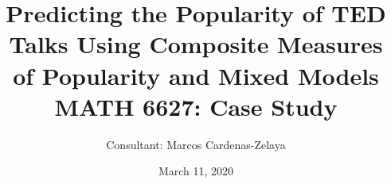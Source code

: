 \documentclass{beamer}
\title[]{Predicting the Popularity of TED Talks Using Composite Measures of Popularity and Mixed Models\\ 
{
\medskip
}
\small MATH 6627: Case Study}
\author{Consultant: Marcos Cardenas-Zelaya} %

{

\medskip

}
\date{March 11, 2020} %
\begin{document}
	
\begin{frame}
	\titlepage 
\end{frame}












\end{document}
